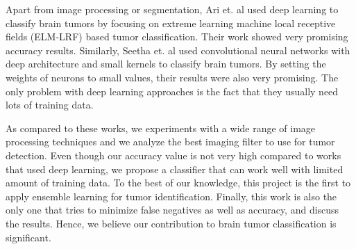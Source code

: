 \documentclass[conference]{IEEEtran}
\begin{document}
Apart from image processing or segmentation, Ari et. al \cite{b5} used deep learning to classify brain tumors by focusing on extreme learning machine local receptive fields (ELM-LRF) based tumor classification. Their work showed very promising accuracy results. Similarly, Seetha et. al \cite{b6} used convolutional neural networks with deep architecture and small kernels to classify brain tumors. By setting the weights of neurons to small values, their results were also very promising. The only problem with deep learning approaches is the fact that they usually need lots of training data. 

As compared to these works, we experiments with a wide range of image processing techniques and we analyze the best imaging filter to use for tumor detection. Even though our accuracy value is not very high compared to works that used deep learning, we propose a classifier that can work well with limited amount of training data. To the best of our knowledge, this project is the first to apply ensemble learning for tumor identification. Finally, this work is also the only one that tries to minimize false negatives as well as accuracy, and discuss the results. Hence, we believe our contribution to brain tumor classification is significant.
\end{document}
